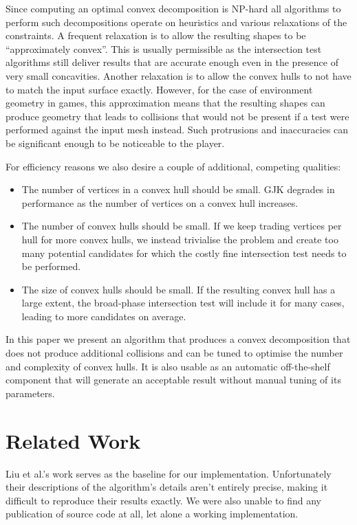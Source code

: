\documentclass[format=sigconf]{acmart}
\begin{document}
Since computing an optimal convex decomposition is NP-hard\cite{1056648} all algorithms to perform such decompositions operate on heuristics and various relaxations of the constraints. A frequent relaxation is to allow the resulting shapes to be ``approximately convex''. This is usually permissible as the intersection test algorithms still deliver results that are accurate enough even in the presence of very small concavities. Another relaxation is to allow the convex hulls to not have to match the input surface exactly. However, for the case of environment geometry in games, this approximation means that the resulting shapes can produce geometry that leads to collisions that would not be present if a test were performed against the input mesh instead. Such protrusions and inaccuracies can be significant enough to be noticeable to the player.

For efficiency reasons we also desire a couple of additional, competing qualities:
\begin{itemize}
\item The number of vertices in a convex hull should be small. GJK degrades in performance as the number of vertices on a convex hull increases.
\item The number of convex hulls should be small. If we keep trading vertices per hull for more convex hulls, we instead trivialise the problem and create too many potential candidates for which the costly fine intersection test needs to be performed.
\item The size of convex hulls should be small. If the resulting convex hull has a large extent, the broad-phase intersection test will include it for many cases, leading to more candidates on average.
\end{itemize}

In this paper we present an algorithm that produces a convex decomposition that does not produce additional collisions and can be tuned to optimise the number and complexity of convex hulls. It is also usable as an automatic off-the-shelf component that will generate an acceptable result without manual tuning of its parameters.

\section{Related Work}\label{relatedwork}
Liu et al.\cite{liu2008convex}'s work serves as the baseline for our implementation. Unfortunately their descriptions of the algorithm's details aren't entirely precise, making it difficult to reproduce their results exactly. We were also unable to find any publication of source code at all, let alone a working implementation.
\end{document}
